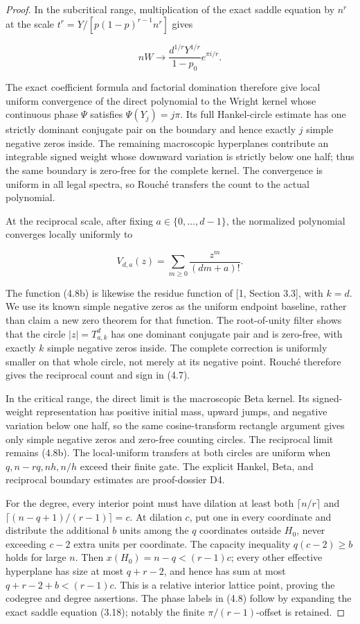 \documentclass[10pt]{article}
\begin{document}
\begin{proof}


In the subcritical range, multiplication of the exact saddle equation by
$n^r$ at the scale
$t^r=Y/[p(1-p)^{r-1}n^r]$ gives

\[
 nW\longrightarrow
 \frac{d^{1/r}Y^{1/r}}{1-p_0}e^{\pi i/r}. \tag{4.8a}
\]

The exact coefficient formula and factorial domination therefore give local
uniform convergence of the direct polynomial to the Wright kernel whose
continuous phase $\Psi$ satisfies $\Psi(Y_j)=j\pi$.  Its full Hankel-circle
estimate has one strictly dominant conjugate pair on the boundary and hence
exactly $j$ simple negative zeros inside.  The remaining macroscopic
hyperplanes contribute an integrable signed weight whose downward variation is
strictly below one half; thus the same boundary is zero-free for the complete
kernel.  The convergence is uniform in all legal spectra, so Rouché transfers
the count to the actual polynomial.

At the reciprocal scale, after fixing
$a\in\{0,\ldots,d-1\}$, the normalized polynomial converges locally
uniformly to

\[
 V_{d,a}(z)=\sum_{m\ge0}\frac{z^m}{(dm+a)!}. \tag{4.8b}
\]

The function (4.8b) is likewise the residue function of [1, Section 3.3],
with $k=d$.  We use its known simple negative zeros as the uniform endpoint
baseline, rather than claim a new zero theorem for that function.
The root-of-unity filter shows that the circle
$|z|=T_{a,k}^{d}$ has one dominant conjugate pair and is zero-free, with
exactly $k$ simple negative zeros inside.  The complete correction is
uniformly smaller on that whole circle, not merely at its negative point.
Rouché therefore gives the reciprocal count and sign in (4.7).

In the critical range, the direct limit is the macroscopic Beta kernel.  Its
signed-weight representation has positive initial mass, upward jumps, and
negative variation below one half, so the same cosine-transform rectangle
argument gives only simple negative zeros and zero-free counting circles.  The
reciprocal limit remains (4.8b).  The local-uniform transfers at both circles
are uniform when $q,n-rq,nh,n/h$ exceed their finite gate.  The explicit
Hankel, Beta, and reciprocal boundary estimates are proof-dossier D4.

For the degree, every interior point must have dilation
at least both $\lceil n/r\rceil$ and $\lceil(n-q+1)/(r-1)\rceil=c$.
At dilation $c$, put one in every coordinate and distribute the additional
$b$ units among the $q$ coordinates outside $H_0$, never exceeding
$c-2$ extra units per coordinate.  The capacity inequality
$q(c-2)\ge b$ holds for large $n$.  Then $x(H_0)=n-q<(r-1)c$; every
other effective hyperplane has size at most $q+r-2$, and hence has sum at
most $q+r-2+b<(r-1)c$.  This is a relative interior lattice point, proving
the codegree and degree assertions.  The phase labels in (4.8) follow by
expanding the exact saddle equation (3.18); notably the finite
$\pi/(r-1)$-offset is retained.
\end{proof}
\end{document}
